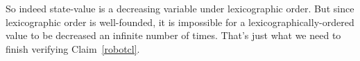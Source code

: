 So indeed state-value is a decreasing variable under lexicographic order.
But since lexicographic order is well-founded, it is impossible for a
lexicographically-ordered value to be decreased an infinite number of
times.  That's just what we need to finish verifying Claim~\ref{robotcl}.
\fi


\begin{problems}
\homeworkproblems








\classproblems







\end{problems}


\endinput
